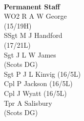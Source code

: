 \begin{multicols}{4}
  \\
  \textbf{Permanent Staff} \\
  WO2 R A W George \\ \indent (15/19H) \\
  SSgt M J Handford \\ \indent (17/21L) \\
  Sgt J L W James \\ \indent (Scots DG) \\
  Sgt P J L Kinvig (16/5L) \\
  Cpl P Jackson (16/5L) \\
  Cpl J Wyatt (16/5L) \\
  Tpr A Salisbury \\ \indent (Scots DG)
\end{multicols}

\pagebreak
